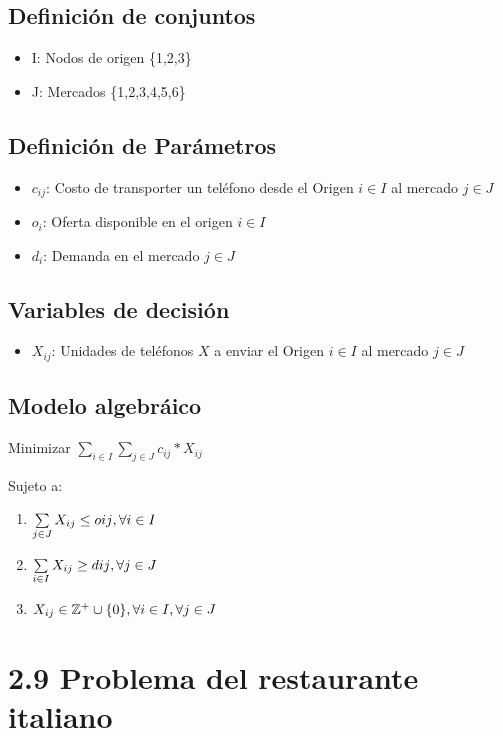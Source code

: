 \documentclass{article}
\begin{document}
\subsection*{Definición de conjuntos}
\begin{itemize}
    \item I: Nodos de origen \{1,2,3\}
    \item J: Mercados \{1,2,3,4,5,6\}
\end{itemize}

\subsection*{Definición de Parámetros}
\begin{itemize}
    \item $c_{ij}$: Costo de transporter un teléfono desde el Origen $i \in I$ al mercado $j \in J$
    \item $o_{i}$: Oferta disponible en el origen $i \in I$
    \item $d_{i}$: Demanda en el mercado $j \in J$
\end{itemize}

\subsection*{Variables de decisión}
\begin{itemize}
    \item $X_{ij}$: Unidades de teléfonos $X$ a enviar el Origen $i \in I$ al mercado $j \in J$
\end{itemize}

\subsection*{Modelo algebráico}

Minimizar $\sum\limits_{i \in I}\sum\limits_{j \in J} c_{ij}*X_{ij}$ \bigskip

Sujeto a:
\begin{enumerate}
    \item $\sum\limits_{j \in J} X_{ij} \leq o{ij}, \hfill \forall i \in I$
    \item $\sum\limits_{i \in I} X_{ij} \geq d{ij}, \hfill \forall j \in J$
    \item $X_{ij} \in \mathbb{Z^+} \cup \{0\}, \hfill \forall i \in I, \forall j \in J$ 
\end{enumerate} 

\newpage
\section*{2.9 Problema del restaurante italiano}
\end{document}
